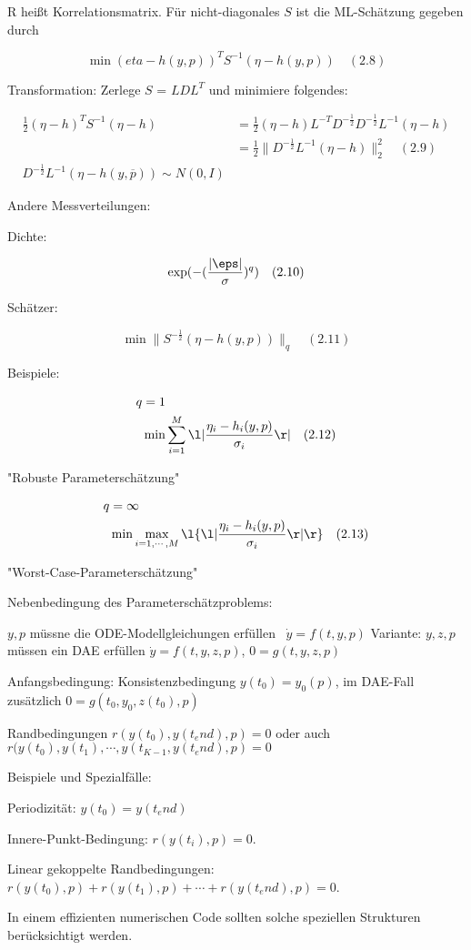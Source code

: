 R heißt Korrelationsmatrix. Für nicht-diagonales $S$ ist die ML-Schätzung gegeben durch

\[ \min (eta-h(y,p))^T S^{-1} (\eta-h(y,p)) \quad (2.8)\]

Transformation: Zerlege $S$ = $LDL^T$ und minimiere folgendes:

\begin{align*}
\frac 12 (\eta -h)^T S^{-1} (\eta-h) &= \frac 12 (\eta-h)L^{-T} D^{-\frac 12} D^{-\frac 12} L^{-1} (\eta-h) \\
&= \frac 12 \|D^{-\frac 12} L^{-1}(\eta -h)\|_2^2 \quad (2.9) \\
D^{-\frac 12} L^{-1} (\eta -h(y,\overline p)) \sim N(0,I)
\end{align*}

Andere Messverteilungen:

Dichte:

\[\exp(-(\frac{|\eps|}{\sigma})^q) \quad (2.10)\]

Schätzer:

\[ \min \|S^{-\frac 12} (\eta-h(y,p)) \|_q \quad (2.11)\]

Beispiele:

\begin{align*}
q &= 1 \\
& \min \sum_{i=1}^M \l| \frac{\eta_i-h_i(y,p)}{\sigma_i} \r| \quad (2.12)
\end{align*}

"Robuste Parameterschätzung"


\begin{align*}
q &= \infty \\
& \min \max_{i=1,\cdots,M} \l\{ \l| \frac{\eta_i-h_i(y,p)}{\sigma_i} \r| \r\} \quad (2.13)
\end{align*}


"Worst-Case-Parameterschätzung"


Nebenbedingung des Parameterschätzproblems:

\item $y,p$ müssne die ODE-Modellgleichungen erfüllen
\ $\dot y = f(t,y,p)$
Variante: $y,z,p$ müssen ein DAE erfüllen $\dot y = f(t,y,z,p)$, $0=g(t,y,z,p)$
\item Anfangsbedingung: Konsistenzbedingung $y(t_0) = y_0(p)$, im DAE-Fall zusätzlich $0=g(t_0,y_0,z(t_0),p)$
\item Randbedingungen $r(y(t_0),y(t_end),p) = 0$ oder auch $r(y(t_0),y(t_1),\cdots,y(t_{K-1}, y(t_end),p) = 0$

Beispiele und Spezialfälle:

Periodizität: $y(t_0) = y(t_end)$

Innere-Punkt-Bedingung: $r(y(t_i),p) = 0$.

Linear gekoppelte Randbedingungen: $r(y(t_0),p) + r(y(t_1),p) + \cdots + r(y(t_end),p) = 0$.

In einem effizienten numerischen Code sollten solche speziellen Strukturen berücksichtigt werden.



